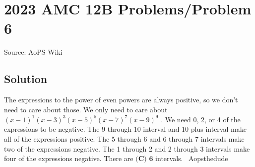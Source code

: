 \documentclass[12pt]{article}
\begin{document}
\section*{{2023 AMC 12B Problems/Problem 6}}
Source: AoPS Wiki

\subsection*{Solution}
The expressions to the power of even powers are always positive, so we don't need to care about those. We only need to care about $(x-1)^1(x-3)^3(x-5)^5(x-7)^7(x-9)^9$ . We need 0, 2, or 4 of the expressions to be negative. The 9 through 10 interval and 10 plus interval make all of the expressions positive. The 5 through 6 and 6 through 7 intervals make two of the expressions negative. The 1 through 2 and 2 through 3 intervals make four of the expressions negative. There are $\boxed{\textbf{(C) 6}}$ intervals. ~Aopsthedude
\end{document}
